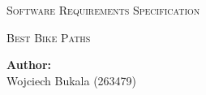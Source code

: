 \begin{titlepage}
    \centering

    \vfill
    
    {\scshape\LARGE Software Requirements Specification\par}
    {\scshape\Large Best Bike Paths\par}
    

    \vfill
    
    \begin{flushleft}
    \textbf{Author:}\\
    Wojciech Bukala (263479)\\

    \end{flushleft}

    \vspace{1cm}
    
\end{titlepage}